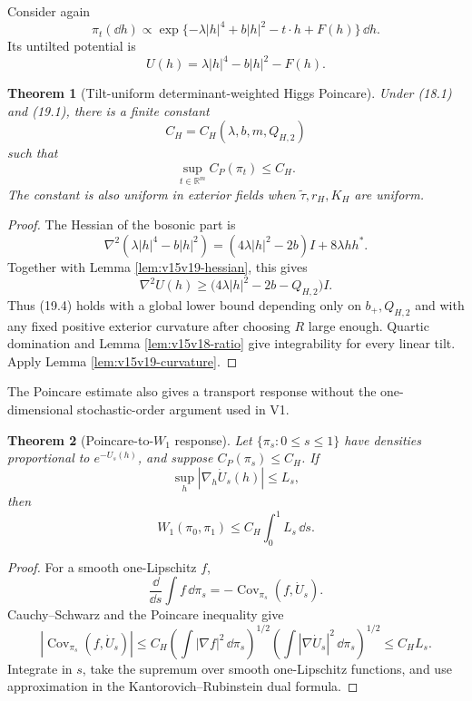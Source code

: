 \documentclass[11pt]{article}
\newtheorem{theorem}{Theorem}[section]
\theoremstyle{remark}
\begin{document}
Consider again
\[
 \pi_t(\dd h)
 \propto
 \exp\{-\lambda|h|^4+b|h|^2-t\cdot h+F(h)\}\,\dd h.          \tag{19.7}
\]
Its untilted potential is
\[
 U(h)=\lambda|h|^4-b|h|^2-F(h).                             \tag{19.8}
\]

\begin{theorem}[Tilt-uniform determinant-weighted Higgs Poincare]
\label{thm:v15v19-poincare}
Under (18.1) and (19.1), there is a finite constant
\[
 C_H=C_H(\lambda,b,m,Q_{H,2})                               \tag{19.9}
\]
such that
\[
 \boxed{
 \sup_{t\in\mathbb R^m}C_P(\pi_t)\le C_H.}                  \tag{19.10}
\]
The constant is also uniform in exterior fields when
\(\widetilde\tau,r_H,K_H\) are uniform.
\end{theorem}

\begin{proof}
The Hessian of the bosonic part is
\[
 \nabla^2(\lambda|h|^4-b|h|^2)
 =
 (4\lambda|h|^2-2b)I+8\lambda hh^*.                        \tag{19.11}
\]
Together with Lemma \ref{lem:v15v19-hessian}, this gives
\[
 \nabla^2U(h)
 \ge
 \bigl(4\lambda|h|^2-2b-Q_{H,2}\bigr)I.                    \tag{19.12}
\]
Thus (19.4) holds with a global lower bound depending only on
\(b_+,Q_{H,2}\) and with any fixed positive exterior curvature
after choosing \(R\) large enough.  Quartic domination and Lemma
\ref{lem:v15v18-ratio} give integrability for every linear tilt.
Apply Lemma \ref{lem:v15v19-curvature}.
\end{proof}

The Poincare estimate also gives a transport response without the
one-dimensional stochastic-order argument used in V1.

\begin{theorem}[Poincare-to-\(W_1\) response]
\label{thm:v15v19-response}
Let \(\{\pi_s:0\le s\le1\}\) have densities proportional to
\(e^{-U_s(h)}\), and suppose \(C_P(\pi_s)\le C_H\).  If
\[
 \sup_h|\nabla_h\dot U_s(h)|\le L_s,                        \tag{19.13}
\]
then
\[
 \boxed{
 W_1(\pi_0,\pi_1)
 \le C_H\int_0^1L_s\,\dd s.}                               \tag{19.14}
\]
\end{theorem}

\begin{proof}
For a smooth one-Lipschitz \(f\),
\[
 \frac{\dd}{\dd s}\int f\,\dd\pi_s
 =
 -\operatorname{Cov}_{\pi_s}(f,\dot U_s).                  \tag{19.15}
\]
Cauchy--Schwarz and the Poincare inequality give
\[
 |\operatorname{Cov}_{\pi_s}(f,\dot U_s)|
 \le
 C_H
 \left(\int|\nabla f|^2\,\dd\pi_s\right)^{1/2}
 \left(\int|\nabla\dot U_s|^2\,\dd\pi_s\right)^{1/2}
 \le C_HL_s.                                                \tag{19.16}
\]
Integrate in \(s\), take the supremum over smooth
one-Lipschitz functions, and use approximation in the
Kantorovich--Rubinstein dual formula.
\end{proof}
\end{document}
